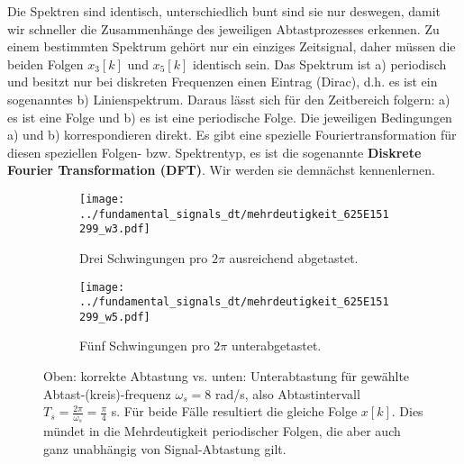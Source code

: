 \begin{ExCalc}
\begin{center}
\end{center}
%
Die Spektren sind identisch, unterschiedlich bunt sind sie nur deswegen,
damit wir schneller die Zusammenhänge des jeweiligen Abtastprozesses erkennen.
%
Zu einem bestimmten Spektrum gehört nur ein einziges Zeitsignal, daher
müssen die beiden Folgen $x_3[k]$ und $x_5[k]$ identisch sein.
%
Das Spektrum ist a) periodisch und besitzt nur bei diskreten Frequenzen einen
Eintrag (Dirac), d.h. es ist ein sogenanntes b) Linienspektrum.
%
Daraus lässt sich für den Zeitbereich folgern: a) es ist eine Folge und b)
es ist eine periodische Folge.
Die jeweiligen Bedingungen a) und b) korrespondieren direkt.
%
Es gibt eine spezielle Fouriertransformation für diesen speziellen Folgen- bzw.
Spektrentyp, es ist die sogenannte \textbf{Diskrete Fourier Transformation (DFT)}.
%
Wir werden sie demnächst kennenlernen.
%
\end{ExCalc}
%
\begin{figure*}[h]
\centering
\begin{subfigure}{0.75\textwidth}
\texttt{[image: ../fundamental\_signals\_dt/mehrdeutigkeit\_625E151299\_w3.pdf]}
\caption{Drei Schwingungen pro $2\pi$ ausreichend abgetastet.}
\label{fig:mehrdeutigkeit_625E151299_w3}
\end{subfigure}
%
\begin{subfigure}{0.75\textwidth}
\texttt{[image: ../fundamental\_signals\_dt/mehrdeutigkeit\_625E151299\_w5.pdf]}
\caption{Fünf Schwingungen pro $2\pi$ unterabgetastet.}
\label{fig:mehrdeutigkeit_625E151299_w5}
\end{subfigure}
\caption{Oben: korrekte Abtastung vs. unten: Unterabtastung für
gewählte Abtast-(kreis)-frequenz $\omega_s = 8$ rad/s,
also Abtastintervall $T_s = \frac{2\pi}{\omega_s} = \frac{\pi}{4}$ s.
Für beide Fälle resultiert die gleiche Folge $x[k]$. Dies mündet in die
Mehrdeutigkeit periodischer Folgen, die aber auch ganz unabhängig von
Signal-Abtastung gilt.}
\label{fig:mehrdeutigkeit_625E151299}
\end{figure*}


















